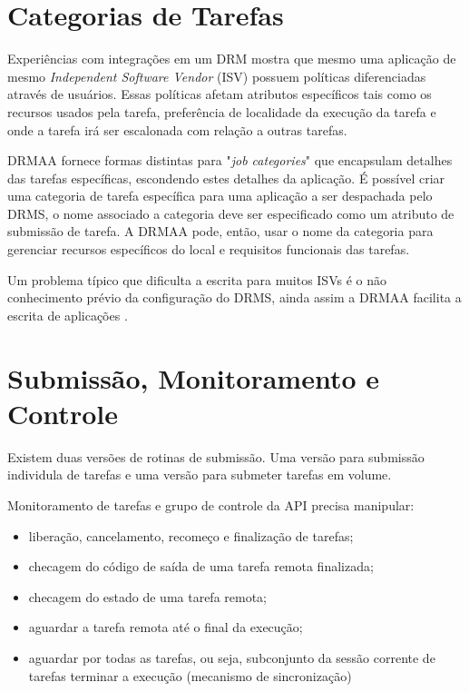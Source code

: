 \section{Categorias de Tarefas}

Experiências com integrações em um DRM mostra que mesmo uma aplicação de mesmo \emph{Independent Software Vendor} (ISV) possuem políticas diferenciadas através de usuários. Essas políticas afetam atributos específicos tais como os recursos usados pela tarefa, preferência de localidade da execução da tarefa e onde a tarefa irá ser escalonada com relação a outras tarefas.

DRMAA fornece formas distintas para "\emph{job categories}" que encapsulam detalhes das tarefas específicas, escondendo estes detalhes da aplicação. É possível criar uma categoria de tarefa específica para uma aplicação a ser despachada pelo DRMS, o nome associado a categoria deve ser especificado como um atributo de submissão de tarefa. A DRMAA pode, então, usar o nome da categoria para gerenciar recursos específicos do local e requisitos funcionais das tarefas.

Um problema típico que dificulta a escrita para muitos ISVs é o não conhecimento prévio da configuração do DRMS, ainda assim a DRMAA facilita a escrita de aplicações \cite{Rajic2002}.

\section{Submissão, Monitoramento e Controle}

Existem duas versões de rotinas de submissão. Uma versão para submissão individula de tarefas e uma versão para submeter tarefas em volume. 

Monitoramento de tarefas e grupo de controle da API precisa manipular:
\begin{itemize}
	\item liberação, cancelamento, recomeço e finalização de tarefas;
	\item checagem do código de saída de uma tarefa remota finalizada;
	\item checagem do estado de uma tarefa remota;
	\item aguardar a tarefa remota até o final da execução;
	\item aguardar por todas as tarefas, ou seja, subconjunto da sessão corrente de tarefas terminar a execução (mecanismo de sincronização)
\end{itemize}


